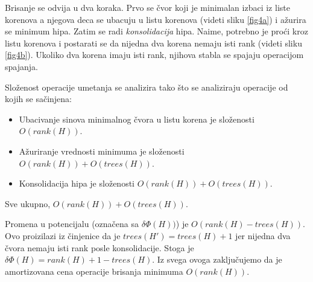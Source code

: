 \documentclass[a4paper]{article}
\theoremstyle{plain}
\theoremstyle{definition}
\begin{document}
Brisanje se odvija u dva koraka. Prvo se \v{c}vor koji je minimalan izbaci iz liste korenova a njegova deca se ubacuju u listu korenova (videti sliku \ref{fig4a}) i a\v{z}urira se minimum hipa. Zatim se radi \emph{konsolidacija} hipa. Naime, potrebno je pro\'c{}i kroz listu korenova i postarati se da nijedna dva korena nemaju isti rank (videti sliku \ref{fig4b}). Ukoliko dva korena imaju isti rank, njihova stabla se spajaju operacijom spajanja.

Slo\v{z}enost operacije umetanja se analizira tako \v{s}to se analiziraju operacije od kojih se sa\v{c}injena:
\begin{itemize}
    \item Ubacivanje sinova minimalnog \v{c}vora u listu korena je slo\v{z}enosti $O(rank(H))$.
    \item A\v{z}uriranje vrednosti minimuma je slo\v{z}enosti $O(rank(H)) + O(trees(H))$.
    \item Konsolidacija hipa je slo\v{z}enosti $O(rank(H)) + O(trees(H))$.
\end{itemize}
Sve ukupno, $O(rank(H)) + O(trees(H))$.

Promena u potencijalu (ozna\v{c}ena sa $\delta\Phi(H))$) je $O(rank(H) - trees(H))$. Ovo proizilazi iz \v{c}injenice da je $trees(H') = trees(H) + 1$ jer nijedna dva \v{c}vora nemaju isti rank posle konsolidacije. Stoga je $\delta\Phi(H) = rank(H) + 1 - trees(H)$. Iz svega ovoga zaklju\v{c}ujemo da je amortizovana cena operacije brisanja minimuma $O(rank(H))$.
\end{document}
